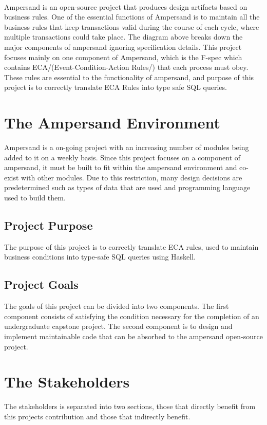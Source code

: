 \documentclass[12pt]{report}
\begin{document}
\paragraph{}
Ampersand is an open-source project that produces design artifacts based on 
business rules. One of the essential functions of Ampersand is to maintain all 
the business rules that keep transactions valid during the course of each 
cycle, where multiple transactions could take place.  The diagram above breaks 
down the major components of ampersand ignoring specification details. This 
project focuses mainly on one component of Ampersand, which is the F-spec which 
contains ECA/(Event-Condition-Action Rules/) that each process must obey. These 
rules are essential to the functionality of ampersand, and purpose of this 
project is to correctly translate ECA Rules into type safe SQL queries.
{\section{The Ampersand Environment}\label{sec:Purpose}}
Ampersand is a on-going project with an increasing number of modules being
added to it on a weekly basis. Since this project focuses on a component of 
ampersand, it must be built to fit within the ampersand environment and 
co-exist with other modules. Due to this restriction, many design decisions are 
predetermined such as types of data that are used and programming language used 
to build them.
\subsection{Project Purpose}
The purpose of this project is to correctly translate ECA rules, used to 
maintain business conditions into type-safe SQL queries using Haskell. 
\subsection{Project Goals} 
The goals of this project can be divided into two components. The first 
component consists of satisfying the condition necessary for the completion of 
an undergraduate capstone project. The second component is to design and 
implement maintainable code that can be absorbed to the ampersand open-source 
project. 
\section{The Stakeholders}\label{sec:Stakeholders}
The stakeholders is separated into two sections, those that directly benefit 
from this projects contribution and those that indirectly benefit.
\end{document}
